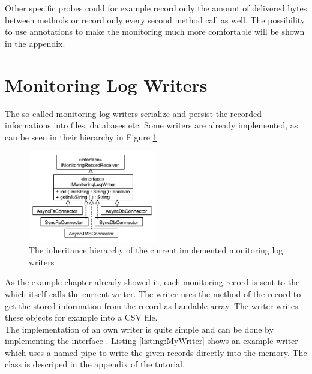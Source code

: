 
		

		\noindent Other specific probes could for example record only the amount of delivered bytes between methods or record only every second method call as well. The possibility to use annotations to make the monitoring much more comfortable will be shown in the appendix.

\section{Monitoring Log Writers}\label{sec:monitoring-log-writers}

		The so called monitoring log writers serialize and persist the recorded informations into files, databases etc. %
		Some writers are already implemented, as can be seen in their hierarchy in Figure \ref{figure:monitoringLogWritersHierarchy}.

		\begin{figure}[H]
			\begin{centering}
				\includegraphics[width=0.5\textwidth]{images/kieker_writerimpls}
				\caption{The inheritance hierarchy of the current implemented monitoring log writers}
				\label{figure:monitoringLogWritersHierarchy}
			\end{centering}
		\end{figure}


		\noindent As the example chapter already showed it, each monitoring record is sent to the  which itself calls the current writer. The writer uses the  method of the record to get the stored information from the record as handable array. The writer writes these objects for example into a CSV file.\\
		The implementation of an own writer is quite simple and can be done by implementing the interface . Listing \ref{listing:MyWriter} shows an example writer which uses a named pipe to write the given records directly into the memory. The class  is descriped in the appendix of the tutorial. 

